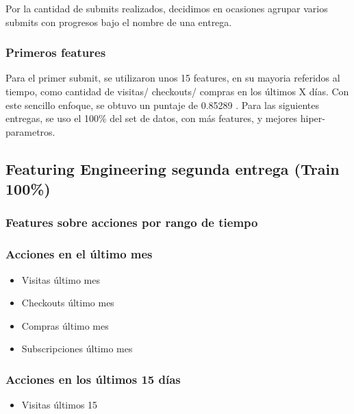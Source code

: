 \documentclass[a4paper ,12pt]{article}
\begin{document}
Por la cantidad de submits realizados, decidimos en ocasiones agrupar varios submits con progresos bajo el nombre de una entrega.

\subsubsection{Primeros features}
Para el primer submit, se utilizaron unos 15 features, en su mayoria referidos al tiempo, como cantidad de visitas/ checkouts/ compras en los últimos X días. Con este sencillo enfoque, se obtuvo un puntaje de 0.85289 . Para las siguientes entregas, se uso el 100\% del set de datos, con más features, y mejores hiper-parametros. 

\subsection{Featuring Engineering segunda entrega (Train 100\%)}

\subsubsection{ Features sobre acciones por rango de tiempo }

		
		\subsubsection{Acciones en el último mes}
	
		\begin{itemize}
		 	
		\item Visitas último mes
		
		\item Checkouts último mes
		
		\item Compras último mes
		
		\item Subscripciones último mes
		\end{itemize}
		
	
		

		\subsubsection{Acciones en los últimos 15 días}		
		
		\begin{itemize}
			\item 	Visitas últimos 15
		\end{itemize}
		
\end{document}
